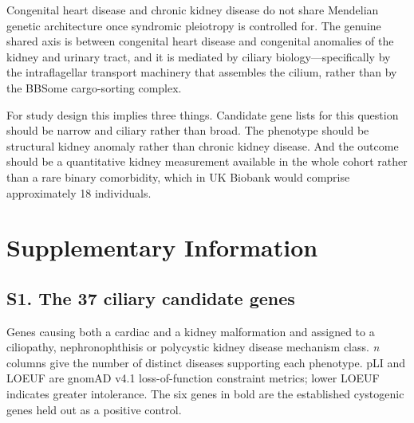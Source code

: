 \documentclass[11pt,a4paper]{article}
\begin{document}
Congenital heart disease and chronic kidney disease do not share Mendelian genetic
architecture once syndromic pleiotropy is controlled for. The genuine shared axis is between
congenital heart disease and congenital anomalies of the kidney and urinary tract, and it is
mediated by ciliary biology---specifically by the intraflagellar transport machinery that
assembles the cilium, rather than by the BBSome cargo-sorting complex.

\enlargethispage{2\baselineskip}
For study design this implies three things. Candidate gene lists for this question should be
narrow and ciliary rather than broad. The phenotype should be structural kidney anomaly
rather than chronic kidney disease. And the outcome should be a quantitative kidney
measurement available in the whole cohort rather than a rare binary comorbidity, which in UK
Biobank would comprise approximately 18 individuals.


\newpage
\appendix
\section{Supplementary Information}

\subsection*{S1. The 37 ciliary candidate genes}

Genes causing both a cardiac and a kidney malformation and assigned to a ciliopathy,
nephronophthisis or polycystic kidney disease mechanism class. \textit{n} columns give the
number of distinct diseases supporting each phenotype. pLI and LOEUF are gnomAD v4.1
loss-of-function constraint metrics; lower LOEUF indicates greater intolerance. The six
genes in bold are the established cystogenic genes held out as a positive control.
\end{document}
